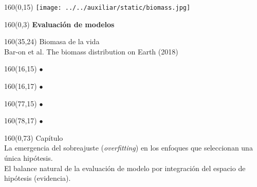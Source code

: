 \documentclass[shownotes,aspectratio=169]{beamer}
\newcounter{capitulo}
\newcommand{\unidad}{\thecapitulo \stepcounter{capitulo}}
\begin{document}
\begin{frame}
\begin{textblock}{160}(0,15) \centering
\texttt{[image: ../../auxiliar/static/biomass.jpg]}
\end{textblock}

\begin{textblock}{160}(0,3) \centering
\LARGE \textcolor{black!90}{\fontsize{22}{0}\selectfont \textbf{Evaluación de modelos}}
\end{textblock}

\begin{textblock}{160}(35,24)
\textcolor{black!95}{\small Biomasa de la vida \\
\fontsize{2}{0}\selectfont \hspace{0.05cm} Bar-on et al. The biomass distribution on Earth (2018) \\}
\end{textblock}

\begin{textblock}{160}(16,15)
\LARGE \textcolor{black!0}{\fontsize{1200}{1200}\selectfont $\bm{\bullet}$ }
\end{textblock}
\begin{textblock}{160}(16,17)
\LARGE \textcolor{black!0}{\fontsize{1200}{1200}\selectfont $\bm{\bullet}$ }
\end{textblock}

\begin{textblock}{160}(77,15)
\LARGE \textcolor{black!0}{\fontsize{1200}{1200}\selectfont $\bm{\bullet}$ }
\end{textblock}
\begin{textblock}{160}(78,17)
\LARGE \textcolor{black!0}{\fontsize{1200}{1200}\selectfont $\bm{\bullet}$ }
\end{textblock}


\begin{textblock}{160}(0,73) \centering
\textcolor{black!95}{Capítulo \unidad \\ \small
La emergencia del sobreajuste (\emph{overfitting}) en los enfoques que seleccionan una única hipótesis. \\
El balance natural de la evaluación de modelo por integración del espacio de hipótesis (evidencia). \\
}
\end{textblock}


\end{frame}
\end{document}
